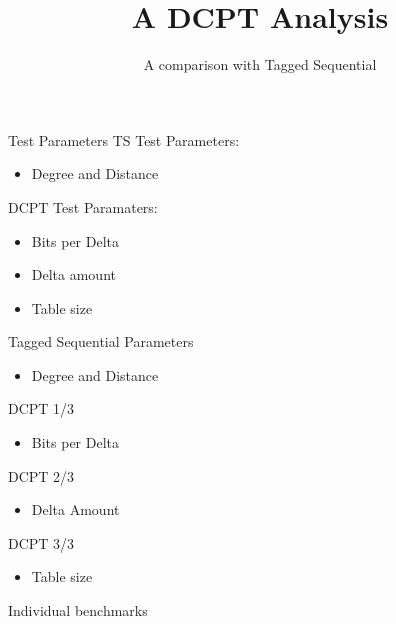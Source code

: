 \documentclass{beamer}
\title{A DCPT Analysis}
\subtitle{A comparison with Tagged Sequential}
\begin{document}
\maketitle

\begin{frame}{Test Parameters}
	TS Test Parameters:
	\begin{itemize}
		\item Degree and Distance
	\end{itemize}
	DCPT Test Paramaters:
	\begin{itemize}
		\item Bits per Delta
		\item Delta amount
		\item Table size
	\end{itemize}
\end{frame}

\begin{frame}{Tagged Sequential Parameters}
	\begin{itemize}
		\item Degree and Distance
	\end{itemize}
	
\end{frame}

\begin{frame}{DCPT 1/3}
	\begin{itemize}
		\item Bits per Delta
	\end{itemize}
	
\end{frame}

\begin{frame}{DCPT 2/3}
	\begin{itemize}
		\item Delta Amount
	\end{itemize}
	
\end{frame}

\begin{frame}{DCPT 3/3}
	\begin{itemize}
		\item Table size
	\end{itemize}
	
\end{frame}

\begin{frame}{Individual benchmarks}
	
\end{frame}
\end{document}
